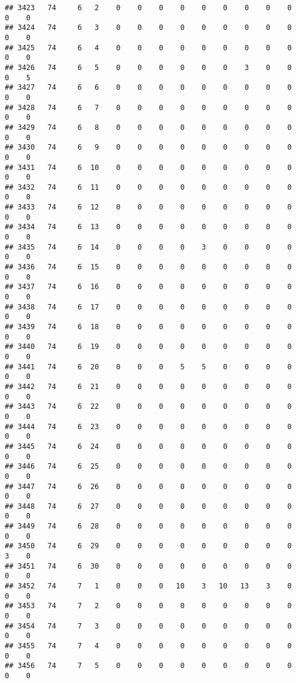 \documentclass[]{article}
\begin{document}
\begin{verbatim}
## 3423   74     6   2    0    0    0    0    0    0    0    0    0    0    0
## 3424   74     6   3    0    0    0    0    0    0    0    0    0    0    0
## 3425   74     6   4    0    0    0    0    0    0    0    0    0    0    0
## 3426   74     6   5    0    0    0    0    0    0    3    0    0    0    5
## 3427   74     6   6    0    0    0    0    0    0    0    0    0    0    0
## 3428   74     6   7    0    0    0    0    0    0    0    0    0    0    0
## 3429   74     6   8    0    0    0    0    0    0    0    0    0    0    0
## 3430   74     6   9    0    0    0    0    0    0    0    0    0    0    0
## 3431   74     6  10    0    0    0    0    0    0    0    0    0    0    0
## 3432   74     6  11    0    0    0    0    0    0    0    0    0    0    0
## 3433   74     6  12    0    0    0    0    0    0    0    0    0    0    0
## 3434   74     6  13    0    0    0    0    0    0    0    0    0    0    0
## 3435   74     6  14    0    0    0    0    3    0    0    0    0    0    0
## 3436   74     6  15    0    0    0    0    0    0    0    0    0    0    0
## 3437   74     6  16    0    0    0    0    0    0    0    0    0    0    0
## 3438   74     6  17    0    0    0    0    0    0    0    0    0    0    0
## 3439   74     6  18    0    0    0    0    0    0    0    0    0    0    0
## 3440   74     6  19    0    0    0    0    0    0    0    0    0    0    0
## 3441   74     6  20    0    0    0    5    5    0    0    0    0    0    0
## 3442   74     6  21    0    0    0    0    0    0    0    0    0    0    0
## 3443   74     6  22    0    0    0    0    0    0    0    0    0    0    0
## 3444   74     6  23    0    0    0    0    0    0    0    0    0    0    0
## 3445   74     6  24    0    0    0    0    0    0    0    0    0    0    0
## 3446   74     6  25    0    0    0    0    0    0    0    0    0    0    0
## 3447   74     6  26    0    0    0    0    0    0    0    0    0    0    0
## 3448   74     6  27    0    0    0    0    0    0    0    0    0    0    0
## 3449   74     6  28    0    0    0    0    0    0    0    0    0    0    0
## 3450   74     6  29    0    0    0    0    0    0    0    0    0    3    0
## 3451   74     6  30    0    0    0    0    0    0    0    0    0    0    0
## 3452   74     7   1    0    0    0   10    3   10   13    3    0    0    0
## 3453   74     7   2    0    0    0    0    0    0    0    0    0    0    0
## 3454   74     7   3    0    0    0    0    0    0    0    0    0    0    0
## 3455   74     7   4    0    0    0    0    0    0    0    0    0    0    0
## 3456   74     7   5    0    0    0    0    0    0    0    0    0    0    0

\end{verbatim}
\end{document}
